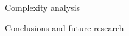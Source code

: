 \documentclass[11pt, a4paper, english, twoside, notitlepage, openright]{report}
\begin{document}
\begin{chapter}{Complexity analysis}
\begin{section}{Conclusions and future research}
\end{section}



\end{chapter}
\end{document}
